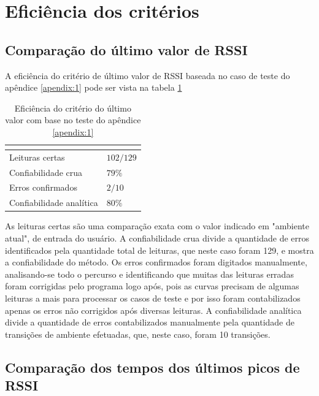 \section{Eficiência dos critérios}

\subsection{Comparação do último valor de RSSI} \label{section:ultimovalorRES}

A eficiência do critério de último valor de RSSI baseada no caso de teste do apêndice \ref{apendix:1} pode ser vista na tabela \ref{tab:resultados1}

\begin{table}[H]
\centering
\caption{Eficiência do critério do último valor com base no teste do apêndice \ref{apendix:1} }
\label{tab:resultados1}
\begin{tabular}{p{5cm} p{5cm}}
\hline
\multicolumn{2}{c}{\cellcolor{lightgray}{Eficiência do critério: Último valor de RSSI}} \\ \hline
Leituras certas         &   $102 / 129$        \\
Confiabilidade crua    &   $79\%$     \\
Erros confirmados          &  $2 /10$        \\
Confiabilidade analítica & $80\%$ \\ \hline
\end{tabular}
\end{table}

As leituras certas são uma comparação exata com o valor indicado em "ambiente atual", de entrada do usuário. A confiabilidade crua divide a quantidade de erros identificados pela quantidade total de leituras, que neste caso foram 129, e mostra a confiabilidade do método. Os erros confirmados foram digitados manualmente, analisando-se todo o percurso e identificando que muitas das leituras erradas foram corrigidas pelo programa logo após, pois as curvas precisam de algumas leituras a mais para processar os casos de teste e por isso foram contabilizados apenas os erros não corrigidos após diversas leituras. A confiabilidade analítica divide a quantidade de erros contabilizados manualmente pela quantidade de transições de ambiente efetuadas, que, neste caso, foram 10 transições.


\subsection{Comparação dos tempos dos últimos picos de RSSI}

